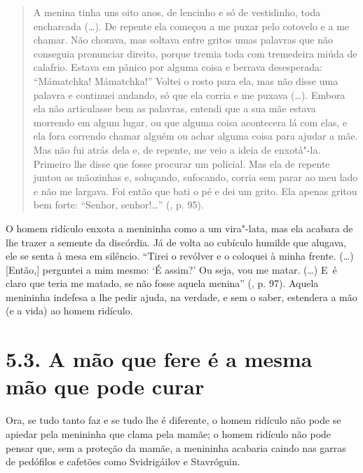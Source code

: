 \begin{quote}
A menina tinha uns oito anos, de lencinho e só de vestidinho, toda
encharcada (\ldots{}). De repente ela começou a me puxar pelo cotovelo e
a me chamar. Não chorava, mas soltava entre gritos umas palavras que não
conseguia pronunciar direito, porque tremia toda com tremedeira miúda de
calafrio. Estava em pânico por alguma coisa e berrava desesperada:
``Mámatchka! Mámatchka!'' Voltei o rosto para ela, mas não disse uma
palavra e continuei andando, só que ela corria e me puxava (\ldots{}).
Embora ela não articulasse bem as palavras, entendi que a sua mãe estava
morrendo em algum lugar, ou que alguma coisa acontecera lá com elas, e
ela fora correndo chamar alguém ou achar alguma coisa para ajudar a mãe.
Mas não fui atrás dela e, de repente, me veio a ideia de enxotá"-la.
Primeiro lhe disse que fosse procurar um policial. Mas ela de repente
juntou as mãozinhas e, soluçando, sufocando, corria sem parar ao meu
lado e não me largava. Foi então que bati o pé e dei um grito. Ela
apenas gritou bem forte: ``Senhor, senhor!\ldots{}'' (, p. 95).
\end{quote}

O homem ridículo enxota a menininha como a um vira"-lata, mas ela acabara
de lhe trazer a semente da discórdia. Já de volta ao cubículo humilde
que alugava, ele se senta à mesa em silêncio. ``Tirei o revólver e o
coloquei à minha frente. (\ldots{}) {[}Então,{]} perguntei a mim mesmo:
`É assim?' Ou seja, vou me matar. (\ldots{}) E~é claro que teria me
matado, se não fosse aquela menina'' (, p. 97). Aquela menininha
indefesa a lhe pedir ajuda, na verdade, e sem o saber, estendera a mão
(e a vida) ao homem ridículo.

\section{5.3. A mão que fere é a mesma mão que pode curar\protect\footnotemark}

Ora, se tudo tanto faz e se tudo lhe é diferente, o homem ridículo não
pode se apiedar pela menininha que clama pela mamãe; o homem ridículo
não pode pensar que, sem a proteção da mamãe, a menininha acabaria
caindo nas garras de pedófilos e cafetões como Svidrigáilov e
Stavróguin.

